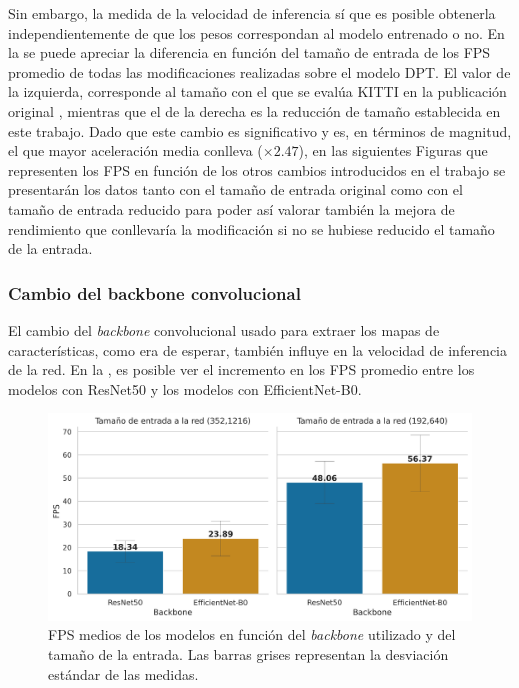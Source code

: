 Sin embargo, la medida de la velocidad de inferencia sí que es posible obtenerla independientemente de que los pesos correspondan al modelo entrenado o no. En la  se puede apreciar la diferencia en función del tamaño de entrada de los FPS promedio de todas las modificaciones realizadas sobre el modelo DPT. El valor de la izquierda, corresponde al tamaño con el que se evalúa KITTI en la publicación original \cite{visiontransformersDPT}, mientras que el de la derecha es la reducción de tamaño establecida en este trabajo. Dado que este cambio es significativo y es, en términos de magnitud, el que mayor aceleración media conlleva ($\times2.47$), en las siguientes Figuras que representen los FPS en función de los otros cambios introducidos en el trabajo se presentarán los datos tanto con el tamaño de entrada original como con el tamaño de entrada reducido para poder así valorar también la mejora de rendimiento que conllevaría la modificación si no se hubiese reducido el tamaño de la entrada.



















\subsubsection{Cambio del backbone convolucional}\label{resultados-cuantitativos-backbone}
El cambio del \textit{backbone} convolucional usado para extraer los mapas de características, como era de esperar, también influye en la velocidad de inferencia de la red. En la , es posible ver el incremento en los FPS promedio entre los modelos con ResNet50 y los modelos con EfficientNet-B0.

\begin{figure}[H]
\centering
\includegraphics[width=0.8\linewidth]{imagenes/Resultados/velocidad_inferencia_backbone.png} 
\captionsetup{width=.8\linewidth}
\caption{FPS medios de los modelos en función del \textit{backbone} utilizado y del tamaño de la entrada. Las barras grises representan la desviación estándar de las medidas.}
\label{fig:resultados-inf-backbone}
\end{figure}


